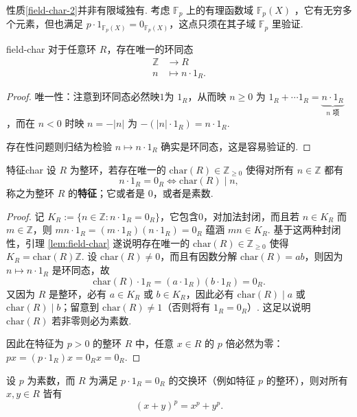 \documentclass[12pt, a4paper]{ctexart}
\begin{document}
性质\eqref{field-char-2}并非有限域独有. 考虑 $ \mathbb{F}_p $ 上的有理函数域 $ \mathbb{F}_p(X) $ ，它有无穷多个元素，但也满足 $ p \cdot 1_{\mathbb{F}_p(X)} = 0_{\mathbb{F}_p(X)} $，这点只须在其子域 $ \mathbb{F}_p $ 里验证.  
\begin{lemma}{}{field-char}
	对于任意环 $ R $，存在唯一的环同态\begin{align*}
		\mathbb{Z}&\longrightarrow R\\n&\longmapsto n \cdot 1_R. 
	\end{align*}
\end{lemma}
\begin{proof}
	唯一性：注意到环同态必然映$1$为 $ 1_R $，从而映 $ n \geq 0 $ 为 $ 1_R + \cdots 1_R = \underbrace{n \cdot 1_R}_{n \text{ 项}} $，而在 $ n < 0 $ 时映 $ n = -|n| $ 为 $ -(|n| \cdot 1_R) = n \cdot 1_R $. 
	
	存在性问题则归结为检验 $ n \mapsto n \cdot 1_R $ 确实是环同态，这是容易验证的. 
\end{proof}
\begin{definition}{特征}{char}
	设 $ R $ 为整环，若存在唯一的 $ \text{char}(R) \in \mathbb{Z}_{\geq 0} $ 使得对所有 $ n \in \mathbb{Z} $ 都有
	\[ n \cdot 1_R = 0_R \iff \text{char}(R) \mid n, \]称之为整环 $ R $ 的\textbf{特征}；它或者是 0，或者是素数. 
\end{definition}
\begin{proof}
	记 $ K_R := \{n \in \mathbb{Z} : n \cdot 1_R = 0_R\} $，它包含$0$，对加法封闭，而且若 $ n \in K_R $ 而 $ m \in \mathbb{Z} $，则 $ mn \cdot 1_R = (m \cdot 1_R)(n \cdot 1_R) = 0_R $ 蕴涵 $ mn \in K_R $. 基于这两种封闭性，引理 \ref{lem:field-char} 遂说明存在唯一的 $ \text{char}(R) \in \mathbb{Z}_{\geq 0} $ 使得 $ K_R = \text{char}(R)\mathbb{Z} $. 设 $ \text{char}(R) \neq 0 $，而且有因数分解 $ \text{char}(R) = ab $，则因为 $ n \mapsto n \cdot 1_R $ 是环同态，故
	\[ \text{char}(R) \cdot 1_R = (a \cdot 1_R)(b \cdot 1_R) = 0_R. \]
	又因为 $ R $ 是整环，必有 $ a \in K_R $ 或 $ b \in K_R $，因此必有 $ \text{char}(R) \mid a $ 或 $ \text{char}(R) \mid b $；留意到 $ \text{char}(R) \neq 1 $（否则将有 $ 1_R = 0_R $）. 这足以说明 $ \text{char}(R) $ 若非零则必为素数. 
	
	因此在特征为 $ p > 0 $ 的整环 $ R $ 中，任意 $ x \in R $ 的 $ p $ 倍必然为零：$ px = (p \cdot 1_R)x = 0_R x = 0_R $. 
\end{proof}
\begin{example}{}{}
	设 $ p $ 为素数，而 $ R $ 为满足 $ p \cdot 1_R = 0_R $ 的交换环（例如特征 $ p $ 的整环），则对所有 $ x, y \in R $ 皆有
	\[ (x + y)^p = x^p + y^p. \]
\end{example}
\end{document}

